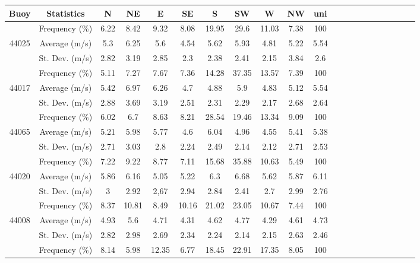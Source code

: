 \begin{table}[H]
\begin{tabular*}{\textwidth}{c@{\hskip 0.07in}cccccccccc @{\extracolsep{\fill}} cccccccccc}
\toprule
    \textbf{Buoy} & \textbf{Statistics} &  \textbf{N} & \textbf{NE}  & \textbf{E} & \textbf{SE} &  \textbf{S} &  \textbf{SW}  &  \textbf{W}  &  \textbf{NW}  & \textbf{uni}  \\ \midrule
    ~       & Frequency (\%)  & 6.22 & 8.42  & 9.32  & 8.08  & 19.95 & 29.6  & 11.03 & 7.38 & 100  \\
    44025   & Average (m/s)   & 5.3  & 6.25  & 5.6   & 4.54  & 5.62  & 5.93  & 4.81  & 5.22 & 5.54 \\
    ~       & St. Dev. (m/s)  & 2.82 & 3.19  & 2.85  & 2.3   & 2.38  & 2.41  & 2.15  & 3.84 & 2.6  \\ \midrule
    ~       & Frequency (\%)  & 5.11 & 7.27  & 7.67  & 7.36  & 14.28 & 37.35 & 13.57 & 7.39 & 100  \\
    44017   & Average (m/s)   & 5.42 & 6.97  & 6.26  & 4.7   & 4.88  & 5.9   & 4.83  & 5.12 & 5.54 \\
    ~       & St. Dev. (m/s)  & 2.88 & 3.69  & 3.19  & 2.51  & 2.31  & 2.29  & 2.17  & 2.68 & 2.64 \\ \midrule
    ~       & Frequency (\%)  & 6.02 & 6.7   & 8.63  & 8.21  & 28.54 & 19.46 & 13.34 & 9.09 & 100  \\
    44065   & Average (m/s)   & 5.21 & 5.98  & 5.77  & 4.6   & 6.04  & 4.96  & 4.55  & 5.41 & 5.38 \\
    ~       & St. Dev. (m/s)  & 2.71 & 3.03  & 2.8   & 2.24  & 2.49  & 2.14  & 2.12  & 2.71 & 2.53 \\ \midrule
    ~       & Frequency (\%)  & 7.22 & 9.22  & 8.77  & 7.11  & 15.68 & 35.88 & 10.63 & 5.49 & 100  \\
    44020   & Average (m/s)   & 5.86 & 6.16  & 5.05  & 5.22  & 6.3   & 6.68  & 5.62  & 5.87 & 6.11 \\
    ~       & St. Dev. (m/s)  & 3    & 2.92  & 2,67  & 2.94  & 2.84  & 2.41  & 2.7   & 2.99 & 2.76 \\ \midrule
    ~       & Frequency (\%)  & 8.37 & 10.81 & 8.49  & 10.16 & 21.02 & 23.05 & 10.67 & 7.44 & 100  \\
    44008   & Average (m/s)   & 4.93 & 5.6   & 4.71  & 4.31  & 4.62  & 4.77  & 4.29  & 4.61 & 4.73 \\
    ~       & St. Dev. (m/s)  & 2.82 & 2.98  & 2.69  & 2.34  & 2.24  & 2.14  & 2.15  & 2.63 & 2.46 \\ \midrule
    ~       & Frequency (\%)  & 8.14 & 5.98  & 12.35 & 6.77  & 18.45 & 22.91 & 17.35 & 8.05 & 100  \\

\end{tabular*}
\end{table}
